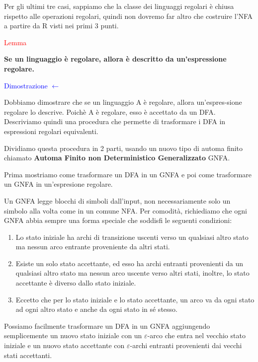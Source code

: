 \documentclass{article}
\begin{document}
    Per gli ultimi tre casi, sappiamo che la classe dei linguaggi regolari è
    chiusa rispetto alle operazioni regolari, quindi non dovremo far altro che
    costruire l'NFA a partire da R visti nei primi 3 punti.

\begin{center}
    \textcolor{red}{Lemma}

    \textbf{Se un linguaggio è regolare, allora è descritto da un'espressione regolare.}
\end{center}

\textcolor{blue}{Dimostrazione $\leftarrow$}

Dobbiamo dimostrare che se un linguaggio A è regolare, allora un'espres-sione
regolare lo descrive. Poichè A è regolare, esso è accettato da un DFA.
Descriviamo quindi una procedura che permette di trasformare i DFA in
espressioni regolari equivalenti.

Dividiamo questa procedura in 2 parti, usando un nuovo tipo di automa finito
chiamato \textbf{Automa Finito non Deterministico Generalizzato} GNFA.

Prima mostriamo come trasformare un DFA in un GNFA e poi come trasformare un
GNFA in un'espresione regolare. 

Un GNFA legge blocchi di simboli dall'input, non necessariamente solo un simbolo
alla volta come in un comune NFA. Per comodità, richiediamo che ogni GNFA abbia
sempre una forma speciale che soddisfi le seguenti condizioni:

\begin{enumerate}
    \item Lo stato iniziale ha archi di transizione uscenti verso un qualsiasi
    altro stato ma nessun arco entrante proveniente da altri stati.
    \item Esiste un solo stato accettante, ed esso ha archi entranti provenienti
    da un qualsiasi altro stato ma nessun arco uscente verso altri stati,
    inoltre, lo stato accettante è diverso dallo stato iniziale.
    \item Eccetto che per lo stato iniziale e lo stato accettante, un arco va da
    ogni stato ad ogni altro stato e anche da ogni stato in sé stesso.
\end{enumerate}

Possiamo facilmente trasformare un DFA in un GNFA aggiungendo semplicemente un
nuovo stato iniziale con un $\varepsilon$-arco che entra nel vecchio stato
iniziale e un nuovo stato accettante con $\varepsilon$-archi entranti
provenienti dai vecchi stati accettanti.
\end{document}
